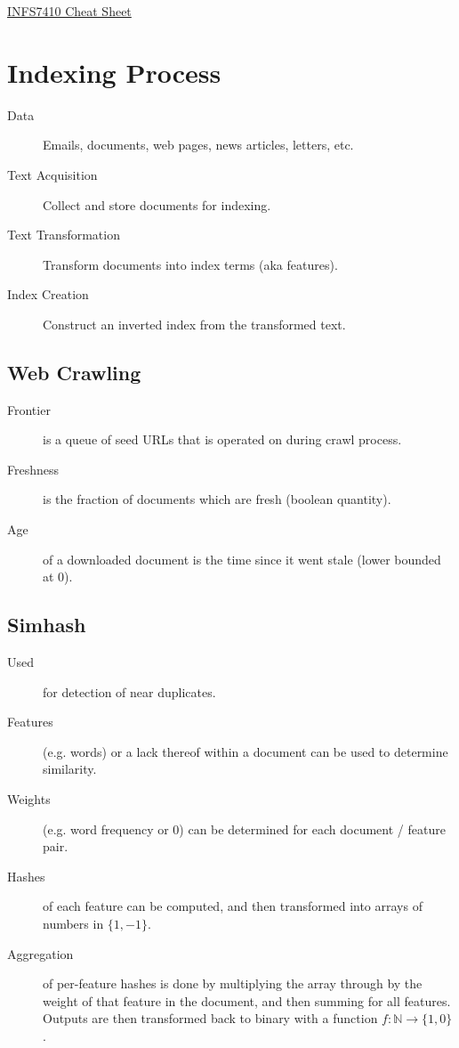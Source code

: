 \documentclass[landscape]{cheat}
\begin{document}
\footnotesize
\begin{multicols*}{3}

\begin{center}
\Large{\underline{INFS7410 Cheat Sheet}} \\
\end{center}


\section{Indexing Process}
\begin{description}
    \item[Data] Emails, documents, web pages, news articles, letters, etc.
    \item[Text Acquisition] Collect and store documents for indexing.
    \item[Text Transformation] Transform documents into index terms (aka features).
    \item[Index Creation] Construct an inverted index from the transformed text.
\end{description}

\subsection{Web Crawling}
\begin{description}
    \item[Frontier] is a queue of seed URLs that is operated on during crawl process.
    \item[Freshness] is the fraction of documents which are fresh (boolean quantity).
    \item[Age] of a downloaded document is the time since it went stale (lower bounded at 0).
\end{description}

\subsection{Simhash}
\begin{description}
    \item[Used] for detection of near duplicates.
    \item[Features] (e.g. words) or a lack thereof within a document can be used to determine similarity.
    \item[Weights] (e.g. word frequency or 0) can be determined for each document / feature pair.
    \item[Hashes] of each feature can be computed, and then transformed into arrays of numbers in $\{1, -1\}$.
    \item[Aggregation] of per-feature hashes is done by multiplying the array through by the weight of that feature in the document, and then summing for all features.
        Outputs are then transformed back to binary with a function $f: \mathbb{N} \rightarrow \{1, 0\}$.
\end{description}


\end{multicols*}
\end{document}
